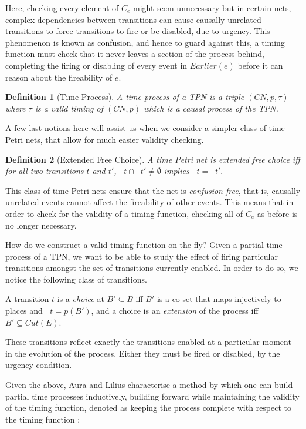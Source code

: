 \documentclass{article}
\DeclareMathOperator*{\pre}{^\bullet}
\theoremstyle{Definition}
\newtheorem{definition}{Definition}
\theoremstyle{definition}
\begin{document}
	Here, checking every element of $C_e$ might seem unnecessary but in certain nets, complex dependencies between transitions can cause causally unrelated transitions to force transitions to fire or be disabled, due to urgency. 
	This phenomenon is known as confusion, and hence to guard against this, a timing function must check that it never leaves a section of the process behind, completing the firing or disabling of every event in $Earlier(e)$ before it can reason about the fireability of $e$. 

	\begin{definition}[Time Process] \label{tp} A \textit{time process} of a TPN is a triple $(CN, p, \tau)$ where $\tau$ is a valid timing of $(CN, p)$ which is a causal process of the TPN. 
	\end{definition}
	
	A few last notions here will assist us when we consider a simpler class of time Petri nets, that allow for much easier validity checking. 
	
	\begin{definition}[Extended Free Choice]\label{efc} A time Petri net is \textit{extended free choice} iff for all two transitions $t$ and $t'$, $\pre t \cap \pre t' \neq \emptyset$ implies $\pre t = \pre t'.$
	\end{definition}
	
	This class of time Petri nets ensure that the net is \textit{confusion-free}, that is, causally unrelated events cannot affect the fireability of other events. 
	This means that in order to check for the validity of a timing function, checking all of $C_e$ as before is no longer necessary. 
	
	How do we construct a valid timing function on the fly? 
	Given a partial time process of a TPN, we want to be able to study the effect of firing particular transitions amongst the set of transitions currently enabled. 
	In order to do so, we notice the following class of transitions. 
	
	A transition $t$ is a \textit{choice} at $B' \subseteq B$ iff $B'$ is a co-set that maps injectively to places and $\pre t = p(B')$, and a choice is an \textit{extension} of the process iff $B' \subseteq Cut(E)$. 
	
	These transitions reflect exactly the transitions enabled at a particular moment in the evolution of the process. Either they must be fired or disabled, by the urgency condition. 
	
	Given the above, Aura and Lilius characterise a method by which one can build partial time processes inductively, building forward while maintaining the validity of the timing function, denoted as keeping the process complete with respect to the timing function : 
	
\end{document}
